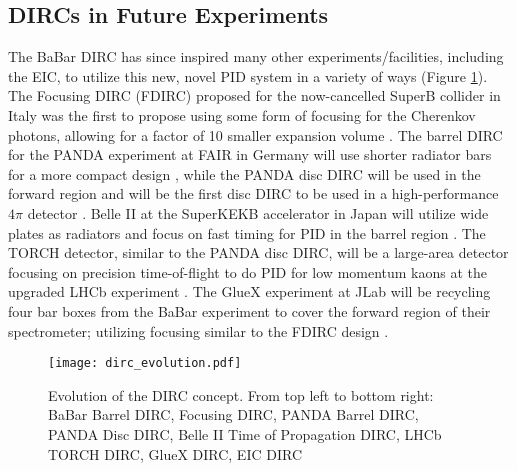 \subsection{DIRCs in Future Experiments}
The BaBar DIRC has since inspired many other experiments/facilities, including the EIC, to utilize this new, novel PID system in a variety of ways (Figure \ref{fig:dirc_evolution}). The Focusing DIRC (FDIRC) proposed for the now-cancelled SuperB collider in Italy was the first to propose using some form of focusing for the Cherenkov photons, allowing for a factor of 10 smaller expansion volume \cite{FDIRC}. The barrel DIRC for the PANDA experiment at FAIR in Germany will use shorter radiator bars for a more compact design \cite{PANDA_barrel}, while the PANDA disc DIRC will be used in the forward region and will be the first disc DIRC to be used in a high-performance $4\pi$ detector \cite{PANDA_disc}. Belle II at the SuperKEKB accelerator in Japan will utilize wide plates as radiators and focus on fast timing for PID in the barrel region \cite{Belle2_TOP}. The TORCH detector, similar to the PANDA disc DIRC, will be a large-area detector focusing on precision time-of-flight to do PID for low momentum kaons at the upgraded LHCb experiment \cite{TORCH}. The GlueX experiment at JLab will be recycling four bar boxes from the BaBar experiment to cover the forward region of their spectrometer; utilizing  focusing similar to the FDIRC design \cite{GlueX}.

\begin{figure}[ht]
	\centering
	\texttt{[image: dirc\_evolution.pdf]}
	\caption{Evolution of the DIRC concept. From top left to bottom right: BaBar Barrel DIRC, Focusing DIRC, PANDA Barrel DIRC, PANDA Disc DIRC, Belle II Time of Propagation DIRC, LHCb TORCH DIRC, GlueX DIRC, EIC DIRC}
	\label{fig:dirc_evolution}
\end{figure}
